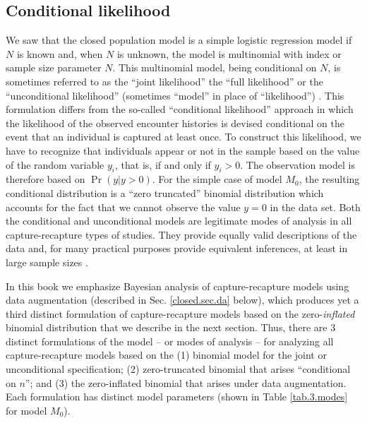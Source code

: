 \subsection{Conditional likelihood}



We saw that the closed population model is a simple logistic
regression model if $N$ is known and, when $N$ is unknown, the model
is multinomial with index or sample size parameter $N$. This
multinomial model, being conditional on $N$, is sometimes referred to
as the ``joint likelihood'' the ``full likelihood'' or the
``unconditional likelihood'' (sometimes
``model'' in place of ``likelihood'')
\citep{sanathanan:1972,borchers_etal:2002}. This
formulation differs from the so-called ``conditional likelihood''
approach in which the likelihood of the observed encounter histories
is devised conditional on the event that an individual is captured at
least once.  To construct this likelihood, we have to recognize that
individuals appear or not in the sample based on the value of the
random variable $y_{i}$, that is, if and only if
$y_{i}>0$.  The observation model is therefore based on $\Pr(y|y>0)$.
For the simple case of model $M_0$, the resulting conditional
distribution is a ``zero truncated'' binomial distribution which
accounts for the fact that we cannot observe the value $y=0$ in the
data set.
 Both the
conditional and unconditional models are legitimate modes of analysis
in all capture-recapture types of studies. They provide equally
valid descriptions of the data and, for many practical purposes provide
equivalent inferences, at least in large sample sizes
\citep{sanathanan:1972}.

In this book we emphasize Bayesian analysis of capture-recapture
models using data augmentation
(described in Sec. \ref{closed.sec.da} below), which
produces yet a third distinct formulation of capture-recapture models
based on the zero-{\it inflated} binomial distribution that we
describe in the next section.  Thus, there are 3 distinct formulations
of the model -- or modes of analysis -- for analyzing all
capture-recapture models based on the (1) binomial model for the joint
or unconditional specification; (2) zero-truncated binomial that
arises ``conditional on $n$''; and (3) the zero-inflated binomial that
arises under data augmentation.  Each formulation has distinct
model parameters (shown in Table \ref{tab.3.modes} for
model $M_0$).


